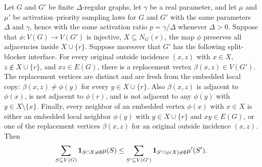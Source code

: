 \begin{helper}
Let $G$ and $G'$ be finite $\Delta$-regular graphs, let $\gamma$ be a real
parameter, and let $\mu$ and $\mu'$ be activation--priority sampling laws for
$G$ and $G'$ with the same parameters \(\Delta\) and \(\gamma\), hence with
the same activation ratio \(p=\gamma/\Delta\) whenever \(\Delta>0\).  Suppose that
$\phi:V(G)\to V(G')$ is injective, $X\subseteq N_G(r)$, the map $\phi$
preserves all adjacencies inside $X\cup\{r\}$.  Suppose moreover that $G'$
has the following split-blocker interface.  For every original outside
incidence $(x,z)$ with $x\in X$, $z\notin X\cup\{r\}$, and $xz\in E(G)$,
there is a replacement vertex $\beta(x,z)\in V(G')$.  The replacement
vertices are distinct and are fresh from the embedded local copy:
$\beta(x,z)\ne\phi(y)$ for every $y\in X\cup\{r\}$.  Also
$\beta(x,z)$ is adjacent to $\phi(x)$, is not adjacent to $\phi(r)$, and is
not adjacent to any $\phi(y)$ with $y\in X\setminus\{x\}$.  Finally, every
neighbor of an embedded vertex $\phi(x)$ with $x\in X$ is either an embedded
local neighbor $\phi(y)$ with $y\in X\cup\{r\}$ and $xy\in E(G)$, or one of
the replacement vertices $\beta(x,z)$ for an original outside incidence
$(x,z)$.  Then
\[
\sum_{S\subseteq V(G)} {\bf 1}_{S\cap X\ne\emptyset}\mu(S)
\le
\sum_{S'\subseteq V(G')} {\bf 1}_{S'\cap \phi(X)\ne\emptyset}\mu'(S').
\]
\end{helper}
